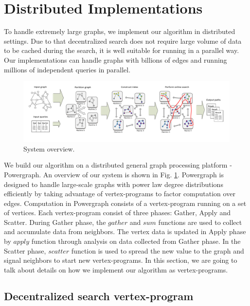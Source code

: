 \section{Distributed Implementations}
\label{implementation}

To handle extremely large graphs, we implement our algorithm in distributed settings. Due to that decentralized search does not require large volume of data to be cached during the search, it is well suitable for running in a parallel way. Our implementations can handle graphs with billions of edges and running millions of independent queries in parallel.

\begin{figure}[t]
    \centering
    \includegraphics[width=\linewidth]{../figures/new_illustrate/system.pdf}
    \caption{System overview.}
    \label{fig:system}
\end{figure}

We build our algorithm on a distributed general graph processing platform - Powergraph\cite{180251}. An overview of our system is shown in Fig. \ref{fig:system}. Powergraph is designed to handle large-scale graphs with power law degree distributions efficiently by taking advantage of vertex-programs to factor computation over edges. Computation in Powergraph consists of a vertex-program running on a set of vertices. Each vertex-program consist of three phases: Gather, Apply and Scatter. During Gather phase, the $gather$ and $sum$ functions are used to collect and accumulate data from neighbors. The vertex data is updated in Apply phase by $apply$ function through analysis on data collected from Gather phase. In the Scatter phase, $scatter$ function is used to spread the new value to the graph and signal neighbors to start new vertex-programs. In this section, we are going to talk about details on how we implement our algorithm as vertex-programs.

\subsection{Decentralized search vertex-program}

